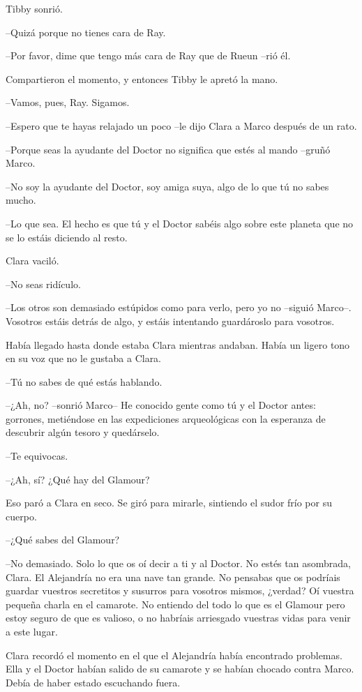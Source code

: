 {Tibby sonrió.}

{--Quizá porque no tienes cara de Ray.}

{--Por favor, dime que tengo más cara de Ray que de Rueun --rió él.}

{Compartieron el momento, y entonces Tibby le apretó la mano.}

{--Vamos, pues, Ray. Sigamos.}

{--Espero que te hayas
relajado un poco --le dijo Clara a Marco después de un rato.}

{--Porque seas la ayudante del Doctor no significa que estés al mando
--gruñó Marco.}

{--No soy la ayudante del Doctor, soy amiga suya, algo de lo que tú no
sabes mucho.}

{--Lo que sea. El hecho es que tú y el Doctor sabéis algo sobre este
planeta que no se lo estáis diciendo al resto.}

{Clara vaciló.}

{--No seas ridículo.}

{--Los otros son demasiado estúpidos como para verlo, pero yo no --siguió
 Marco--. Vosotros estáis detrás de algo, y estáis intentando guardároslo
para vosotros.}

{Había llegado hasta donde estaba Clara mientras andaban. Había un ligero
tono en su voz que no le gustaba a Clara.}

{--Tú no sabes de qué estás hablando.}

{--¿Ah, no? --sonrió Marco-- He conocido gente como tú y el Doctor antes:
 gorrones, metiéndose en las expediciones arqueológicas con la esperanza
de descubrir algún tesoro y quedárselo.}

{--Te equivocas.}

{--¿Ah, sí? ¿Qué hay del Glamour?}

{Eso paró a Clara en seco. Se giró para mirarle, sintiendo el sudor frío
por su cuerpo.}

{--¿Qué sabes del Glamour?}

{--No demasiado. Solo lo que os oí decir a ti y al Doctor. No estés tan
 asombrada, Clara. El Alejandría no era una nave tan grande. No pensabas
 que os podríais guardar vuestros secretitos y susurros para vosotros
 mismos, ¿verdad? Oí vuestra pequeña charla en el camarote. No entiendo
 del todo lo que es el Glamour pero estoy seguro de que es valioso, o no
habríais arriesgado vuestras vidas para venir a este lugar.}

{Clara recordó el momento en el que el Alejandría había encontrado
 problemas. Ella y el Doctor habían salido de su camarote y se habían
chocado contra Marco. Debía de haber estado escuchando fuera.}

